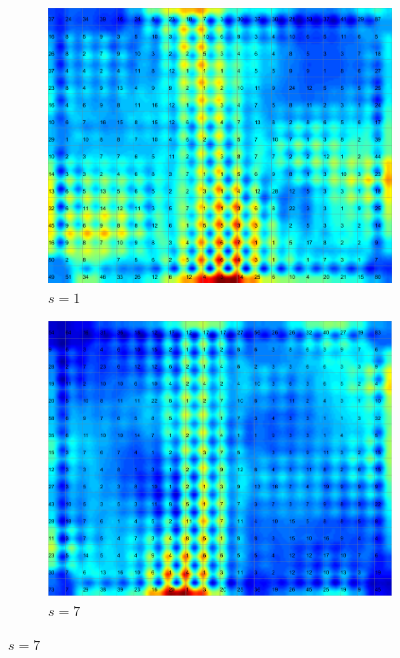 \documentclass{acm_proc_article-sp}
\begin{document}
\begin{figure}
\centering
    \centering
    \begin{subfigure}[b]{0.30\linewidth}
        \includegraphics[width=\linewidth]{img/wine-newmid-u-matrix-seed-1}
        \caption{$s=1$}
        \label{fig:wine-newmid-u-matrix-seed-1}
    \end{subfigure}
    \begin{subfigure}[b]{0.30\linewidth}
        \includegraphics[width=\linewidth]{img/wine-newmid-u-matrix-seed-7}
        \caption{$s=7$}
        \label{fig:wine-newmid-u-matrix-seed-7}
    \end{subfigure}

\end{figure}
\end{document}
